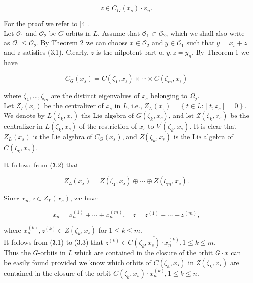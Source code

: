 \documentclass[10pt]{article}
\begin{document}
\begin{equation*}
z \in \overline{C_{G}\left(x_{s}\right) \cdot x_{n}} . \tag{3.1}
\end{equation*}


For the proof we refer to [4].\\
Let $\mathcal{O}_{1}$ and $\mathcal{O}_{2}$ be $G$-orbits in $L$. Assume that $\mathcal{O}_{1} \subset \overline{\mathcal{O}}_{2}$, which we shall also write as $\mathcal{O}_{1} \leqslant \mathcal{O}_{2}$. By Theorem 2 we can choose $x \in \mathcal{O}_{2}$ and $y \in \mathcal{O}_{1}$ such that $y=x_{s}+z$ and $z$ satisfies (3.1). Clearly, $z$ is the nilpotent part of $y, z=y_{n}$. By Theorem 1 we have


\begin{equation*}
C_{G}\left(x_{s}\right)=C\left(\zeta_{1}, x_{s}\right) \times \cdots \times C\left(\zeta_{m}, x_{s}\right) \tag{3.2}
\end{equation*}


where $\zeta_{1}, \ldots, \zeta_{m}$ are the distinct eigenvalues of $x_{s}$ belonging to $\Omega_{j}$.\\
Let $Z_{I}\left(x_{s}\right)$ be the centralizer of $x_{s}$ in $L$, i.e., $Z_{L}\left(x_{s}\right)=\left\{t \in L:\left[t, x_{s}\right]=0\right\}$.\\
We denote by $L\left(\zeta_{k}, x_{s}\right)$ the Lie algebra of $G\left(\zeta_{k}, x_{s}\right)$, and let $Z\left(\zeta_{k}, x_{s}\right)$ be the centralizer in $L\left(\zeta_{k}, x_{s}\right)$ of the restriction of $x_{s}$ to $V^{\prime}\left(\zeta_{k}, x_{s}\right)$. It is clear that $Z_{L}\left(x_{s}\right)$ is the Lie algebra of $C_{G}\left(x_{s}\right)$, and $Z\left(\zeta_{k}, x_{s}\right)$ is the Lie algebra of $C\left(\zeta_{k}, x_{s}\right)$.

It follows from (3.2) that


\begin{equation*}
Z_{L}\left(x_{s}\right)=Z\left(\zeta_{1}, x_{s}\right) \oplus \cdots \oplus Z\left(\zeta_{m}, x_{s}\right) . \tag{3.3}
\end{equation*}


Since $x_{n}, z \in Z_{L}\left(x_{s}\right)$, we have

$$
x_{n}=x_{n}^{(1)}+\cdots+x_{n}^{(m)}, \quad z=z^{(1)}+\cdots+z^{(m)},
$$

where $x_{n}^{(k)}, z^{(k)} \in Z\left(\zeta_{k}, x_{s}\right)$ for $1 \leqslant k \leqslant m$.\\
It follows from (3.1) to (3.3) that $z^{(k)} \in \overline{C\left(\zeta_{k}, x_{s}\right) \cdot x_{n}^{(k)}}, 1 \leqslant k \leqslant m$.\\
Thus the $G$-orbits in $L$ which are contained in the closure of the orbit $G \cdot x$ can be easily found provided we know which orbits of $C\left(\zeta_{k}, x_{s}\right)$ in $Z\left(\zeta_{k}, x_{s}\right)$ are contained in the closure of the orbit $C\left(\zeta_{k}, x_{s}\right) \cdot x_{n}^{(k)}, 1 \leqslant k \leqslant n$.
\end{document}
